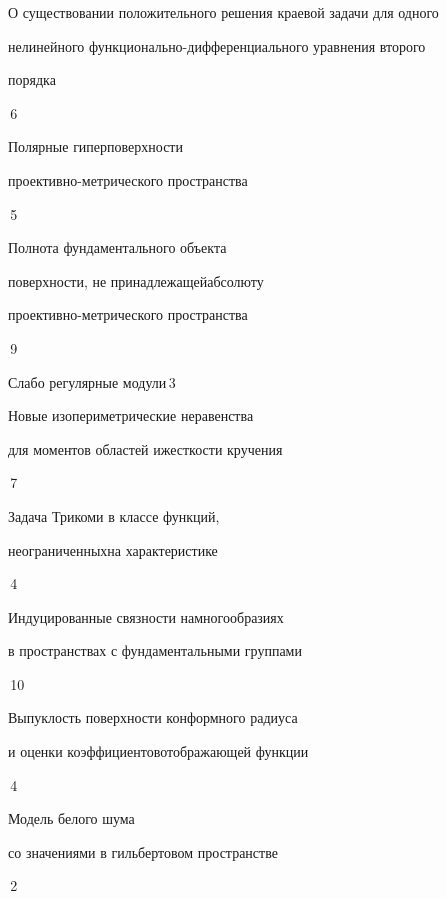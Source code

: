 

{О существовании положительного решения краевой задачи для одного\newline  


нелинейного функционально-дифференциального уравнения второго  


порядка}{\No\,6}




{Полярные гиперповерхности


проективно-метрического пространства}{\No\,5}




{Полнота фундаментального объекта  


поверхности, не принадлежащей\newline абсолюту


проективно-метрического пространства}{\No\,9}




{Слабо регулярные модули}{\No\,3}




{Новые изопериметрические неравенства


для моментов областей и\newline жесткости кручения}{\No\,7}






{Задача Трикоми в классе функций, 


неограниченных\newline на характеристике}{\No\,4}




{Индуцированные связности на\newline многообразиях


в пространствах с фундаментальными группами}{\No\,10}




{Выпуклость поверхности конформного радиуса 


и оценки коэффициентов\newline отображающей функции}{\No\,4}




{Модель белого шума


со значениями в гильбертовом пространстве}{\No\,2}


